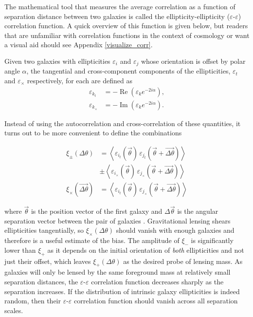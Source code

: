 \documentclass[%
 reprint,
 amsmath,amssymb,
 aps,nofootinbib
]{revtex4-1}
\begin{document}
The mathematical tool that measures the average correlation as a function of separation distance between two galaxies is called the ellipticity-ellipticity ($\varepsilon$-$\varepsilon$) correlation function. A quick overview of this function is given below, but readers that are unfamiliar with correlation functions in the context of cosmology or want a visual aid should see Appendix \ref{visualize_corr}.

Given two galaxies with ellipticities $\varepsilon_i$ and $\varepsilon_j$ whose orientation is offset by polar angle $\alpha$, the tangential and cross-component components of the ellipticities, $\varepsilon_t$ and $\varepsilon_\times$ respectively, for each are defined as
\begin{align}
\varepsilon_{k_t}&=-\operatorname{Re}\left(\varepsilon_k e^{-2i\alpha}\right),\\
\varepsilon_{k_\times}&=-\operatorname{Im}\left(\varepsilon_k e^{-2i\alpha}\right).
\end{align}

\noindent Instead of using the autocorrelation and cross-correlation of these quantities, it turns out to be more convenient to define the combinations

\begin{align}\label{gg_corr_def}
\xi_\pm(\Delta\theta)&=\left<\varepsilon_{i_t}(\vec{\theta})\,\varepsilon_{j_t}(\vec{\theta}+\vec{\Delta\theta})\right>\nonumber \\
&\pm\left<\varepsilon_{i_\times}(\vec{\theta})\,\varepsilon_{j_\times}(\vec{\theta}+\vec{\Delta\theta})\right>\\
\xi_\times(\vec{\Delta\theta})&=\left<\varepsilon_{i_t}(\vec{\theta})\,\varepsilon_{j_\times}(\vec{\theta}+\vec{\Delta\theta})\right>
\end{align}

\noindent where $\vec{\theta}$ is the position vector of the first galaxy and $\Delta\vec{\theta}$ is the angular separation vector between the pair of galaxies \cite{schneider}. Gravitational lensing shears ellipticities tangentially, so $\xi_\times(\Delta\theta)$ should vanish with enough galaxies and therefore is a useful estimate of the bias. The amplitude of $\xi_-$ is significantly lower than $\xi_+$ as it depends on the initial orientation of \textit{both} ellipticities and not just their offset, which leaves $\xi_+(\Delta\theta)$ as the desired probe of lensing mass. As galaxies will only be lensed by the same foreground mass at relatively small separation distances, the $\varepsilon$-$\varepsilon$ correlation function decreases sharply as the separation increases. If the distribution of intrinsic galaxy ellipticities is indeed random, then their $\varepsilon$-$\varepsilon$ correlation function should vanish across all separation scales. 
\end{document}
